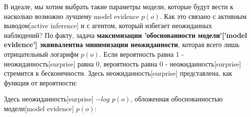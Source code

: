 \documentclass[twoside,leqno, 11pt]{article}
\begin{document}
	\begin{figure}[h]
		\label{ris:image}
	\end{figure}
	
	В идеале, мы хотим выбрать такие параметры модели, которые будут вести к насколько возможно лучшему model evidence $p(o)$. Как это связано с активным выводом[active inference] и с агентом, который избегает неожиданных наблюдений? По факту, задача \textbf{максимизации 'обоснованности модели'['model evidence'] эквивалентна минимизации неожиданности}, которая всего лишь отрицательный логарифм $p(o)$. Если вероятность равна 1 - неожиданность[surprise] равна 0, вероятность равна 0 - неожиданность[surprise] стремится к бесконечности. Здесь неожиданность[surprise] представлена, как функция от вероятности:
	
	\begin{figure}[h]
		\label{ris:image}
	\end{figure}
	
	Здесь неожиданность[surprise] $-log$ $p(o)$, обложенная обоснованностью модели[model evidence] $p(o)$:
	
	\begin{figure}[h!]
		\label{ris:image}
	\end{figure}
	
\end{document}
